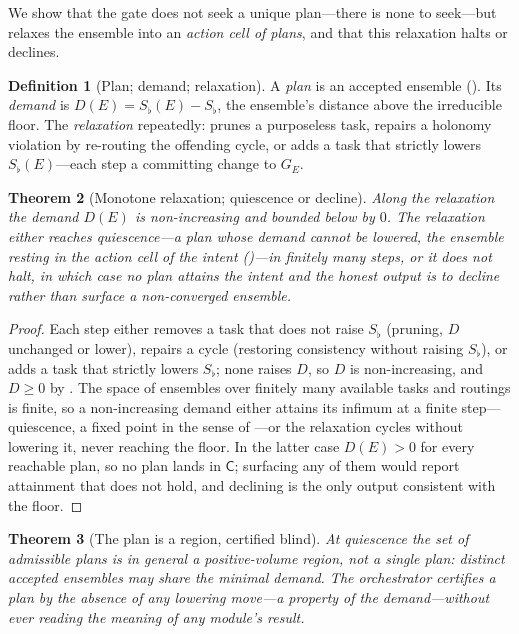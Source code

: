 \documentclass[twocolumn,11pt,a4paper]{article}
\theoremstyle{sup}
\newtheorem{theorem}{Theorem}[section]
\theoremstyle{definition}
\newtheorem{definition}[theorem]{Definition}
\theoremstyle{remark}
\newcommand{\Sflat}{S_{\flat}}        %
\newcommand{\cell}{\mathsf{C}}        %
\newcommand{\Ens}{E}                  %
\newcommand{\dem}{D}                  %
\begin{document}
We show that the gate does not seek a unique plan---there is none to seek---but
relaxes the ensemble into an \emph{action cell of plans}, and that this relaxation
halts or declines.

\begin{definition}[Plan; demand; relaxation]
\label{def:relax}
A \emph{plan} is an accepted ensemble (). Its \emph{demand} is
$\dem(\Ens)=\Sflat(\Ens)-\Sflat$, the ensemble's distance above the irreducible
floor. The \emph{relaxation} repeatedly: prunes a purposeless task, repairs a
holonomy violation by re-routing the offending cycle, or adds a task that strictly
lowers $\Sflat(\Ens)$---each step a committing change to $G_\Ens$.
\end{definition}

\begin{theorem}[Monotone relaxation; quiescence or decline]
\label{thm:relax}
Along the relaxation the demand $\dem(\Ens)$ is non-increasing and bounded below by
$0$. The relaxation either reaches \emph{quiescence}---a plan whose demand cannot
be lowered, the ensemble resting in the action cell of the intent
()---in finitely many steps, or it does not halt, in which case no
plan attains the intent and the honest output is to \emph{decline} rather than
surface a non-converged ensemble.
\end{theorem}

\begin{proof}
Each step either removes a task that does not raise $\Sflat$ (pruning,
$\dem$ unchanged or lower), repairs a cycle (restoring consistency without raising
$\Sflat$), or adds a task that strictly lowers $\Sflat$; none raises $\dem$, so
$\dem$ is non-increasing, and $\dem\ge0$ by . The space of
ensembles over finitely many available tasks and routings is finite, so a
non-increasing demand either attains its infimum at a finite step---quiescence, a
fixed point in the sense of \citet{banach1922,tarski1955,knastertarski1928}---or
the relaxation cycles without lowering it, never reaching the floor. In the latter
case $\dem(\Ens)>0$ for every reachable plan, so no plan lands in $\cell$;
surfacing any of them would report attainment that does not hold, and declining is
the only output consistent with the floor.
\end{proof}

\begin{theorem}[The plan is a region, certified blind]
\label{thm:plan-region}
At quiescence the set of admissible plans is in general a positive-volume region,
not a single plan: distinct accepted ensembles may share the minimal demand. The
orchestrator certifies a plan by the \emph{absence of any lowering move}---a
property of the demand---without ever reading the meaning of any module's result.
\end{theorem}
\end{document}
